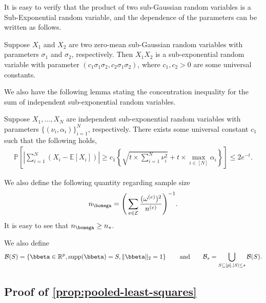 \documentclass[10pt]{article}
\numberwithin{equation}{section}
\newcommand*{\supp}{\mathrm{supp}}
\begin{document}
It is easy to verify that the product of two sub-Gaussian random variables is a Sub-Exponential random variable, and the dependence of the parameters can be written as follows.

\begin{lemma}
\label{lemma:product-sub-gaussian}
    Suppose $X_1$ and $X_2$ are two zero-mean sub-Gaussian random variables with parameters $\sigma_1$ and $\sigma_2$, respectively. Then $X_1 X_2$ is a sub-exponential random variable with parameter $(c_1 \sigma_1\sigma_2, c_2 \sigma_1\sigma_2)$, where $c_1,c_2>0$ are some universal constants.
\end{lemma}


We also have the following lemma stating the concentration inequality for the sum of independent sub-exponential random variables.
\begin{lemma}
\label{lemma:sum-sub-exp}
Suppose $X_1,\ldots, X_N$ are independent sub-exponential random variables with parameters $\{(\nu_i, \alpha_i)\}_{i=1}^N$, respectively. There exists some universal constant $c_1$ such that the following holds,
\begin{align*}
    \mathbb{P}\left[\left|\sum_{i=1}^N (X_i - \mathbb{E}[X_i]) \right| \ge c_1 \left\{\sqrt{t\times \sum_{i=1}^N \nu_i^2} + t\times \max_{i\in [N]} \alpha_i \right\}\right] \le 2e^{-t}.
\end{align*}
\end{lemma}

We also define the following quantity regarding sample size
\begin{align}
\label{eq:def-n-omega}
n_{\bomega} = \Bigg(\sum_{e\in \mathcal{E}} \frac{(\omega^{(e)})^2}{n^{(e)}}\Bigg)^{-1}.
\end{align} It is easy to see that $n_{\bomega} \ge n_*$.

We also define
\begin{align}
\mathcal{B}(S) = \left\{\bbeta \in \mathbb{R}^p, \supp(\bbeta) = S, \|\bbeta\|_2=1\right\} \qquad \text{and} \qquad \mathcal{B}_s = \bigcup_{S\subseteq [p], |S| \le s} \mathcal{B}(S). \label{eq:ball}
\end{align}

\subsection{Proof of \cref{prop:pooled-least-squares}}
\end{document}

